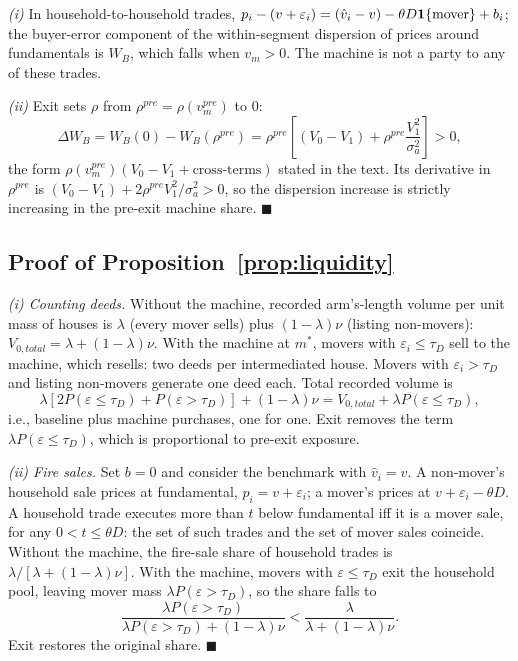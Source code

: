 \emph{(i)} In household-to-household trades, $p_i - (v + \varepsilon_i) = (\hat v_i - v) - \theta D \mathbf{1}\{\text{mover}\} + b_i$; the buyer-error component of the within-segment dispersion of prices around fundamentals is $W_B$, which falls when $v_m > 0$. The machine is not a party to any of these trades.

\emph{(ii)} Exit sets $\rho$ from $\rho^{pre} = \rho(v_m^{pre})$ to $0$:
\[
\Delta W_B = W_B(0) - W_B(\rho^{pre}) = \rho^{pre}\left[ (V_0 - V_1) + \rho^{pre} \frac{V_1^2}{\sigma_a^2} \right] > 0,
\]
the form $\rho(v_m^{pre})(V_0 - V_1 + \text{cross-terms})$ stated in the text. Its derivative in $\rho^{pre}$ is $(V_0 - V_1) + 2\rho^{pre} V_1^2/\sigma_a^2 > 0$, so the dispersion increase is strictly increasing in the pre-exit machine share. $\blacksquare$

\subsection{Proof of Proposition~\ref{prop:liquidity}}

\emph{(i) Counting deeds.} Without the machine, recorded arm's-length volume per unit mass of houses is $\lambda$ (every mover sells) plus $(1-\lambda)\nu$ (listing non-movers): $V_{0,total} = \lambda + (1-\lambda)\nu$. With the machine at $m^*$, movers with $\varepsilon_i \le \tau_D$ sell to the machine, which resells: two deeds per intermediated house. Movers with $\varepsilon_i > \tau_D$ and listing non-movers generate one deed each. Total recorded volume is
\[
\lambda \left[ 2 P(\varepsilon \le \tau_D) + P(\varepsilon > \tau_D) \right] + (1-\lambda)\nu
= V_{0,total} + \lambda P(\varepsilon \le \tau_D),
\]
i.e., baseline plus machine purchases, one for one. Exit removes the term $\lambda P(\varepsilon \le \tau_D)$, which is proportional to pre-exit exposure.

\emph{(ii) Fire sales.} Set $b = 0$ and consider the benchmark with $\hat v_i = v$. A non-mover's household sale prices at fundamental, $p_i = v + \varepsilon_i$; a mover's prices at $v + \varepsilon_i - \theta D$. A household trade executes more than $t$ below fundamental iff it is a mover sale, for any $0 < t \le \theta D$: the set of such trades and the set of mover sales coincide. Without the machine, the fire-sale share of household trades is $\lambda / [\lambda + (1-\lambda)\nu]$. With the machine, movers with $\varepsilon \le \tau_D$ exit the household pool, leaving mover mass $\lambda P(\varepsilon > \tau_D)$, so the share falls to
\[
\frac{\lambda P(\varepsilon > \tau_D)}{\lambda P(\varepsilon > \tau_D) + (1-\lambda)\nu} < \frac{\lambda}{\lambda + (1-\lambda)\nu}.
\]
Exit restores the original share. $\blacksquare$

